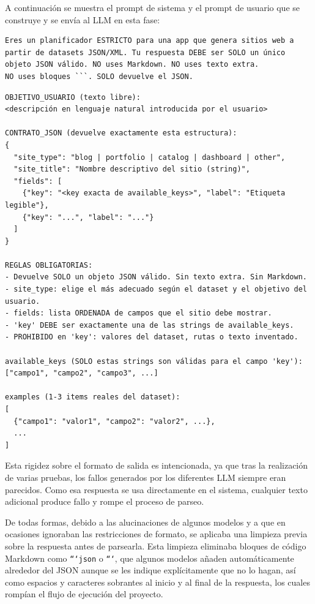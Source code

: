 A continuación se muestra el prompt de sistema y el prompt de usuario que se construye 
y se envía al LLM en esta fase:

\begin{lstlisting}[caption={Prompt de sistema del planner}, label={lst:planner-system}]
Eres un planificador ESTRICTO para una app que genera sitios web a 
partir de datasets JSON/XML. Tu respuesta DEBE ser SOLO un único 
objeto JSON válido. NO uses Markdown. NO uses texto extra. 
NO uses bloques ```. SOLO devuelve el JSON.
\end{lstlisting}

\begin{lstlisting}[caption={Prompt de usuario del planner (estructura general)}, label={lst:planner-user}]
OBJETIVO_USUARIO (texto libre):
<descripción en lenguaje natural introducida por el usuario>

CONTRATO_JSON (devuelve exactamente esta estructura):
{
  "site_type": "blog | portfolio | catalog | dashboard | other",
  "site_title": "Nombre descriptivo del sitio (string)",
  "fields": [
    {"key": "<key exacta de available_keys>", "label": "Etiqueta legible"},
    {"key": "...", "label": "..."}
  ]
}

REGLAS OBLIGATORIAS:
- Devuelve SOLO un objeto JSON válido. Sin texto extra. Sin Markdown.
- site_type: elige el más adecuado según el dataset y el objetivo del usuario.
- fields: lista ORDENADA de campos que el sitio debe mostrar.
- 'key' DEBE ser exactamente una de las strings de available_keys.
- PROHIBIDO en 'key': valores del dataset, rutas o texto inventado.

available_keys (SOLO estas strings son válidas para el campo 'key'):
["campo1", "campo2", "campo3", ...]

examples (1-3 items reales del dataset):
[
  {"campo1": "valor1", "campo2": "valor2", ...},
  ...
]
\end{lstlisting}

Esta rigidez sobre el formato de salida es intencionada, ya que tras la 
realización de varias pruebas, los fallos generados por los diferentes LLM 
siempre eran parecidos. Como esa respuesta se usa directamente en el sistema, 
cualquier texto adicional produce fallo y rompe el proceso de parseo.

De todas formas, debido a las alucinaciones de algunos modelos y a que en 
ocasiones ignoraban las restricciones de formato, se aplicaba una limpieza 
previa sobre la respuesta antes de parsearla. Esta limpieza eliminaba bloques 
de código Markdown como \texttt{```json} o \texttt{```}, que algunos modelos 
añaden automáticamente alrededor del JSON aunque se les indique explícitamente 
que no lo hagan, así como espacios y caracteres sobrantes al inicio y al final 
de la respuesta, los cuales rompían el flujo de ejecución del proyecto.


